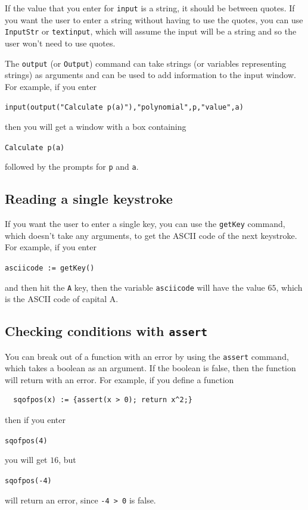 \documentclass[a4paper,11pt]{book}
\begin{document}
If the value that you enter for \texttt{input} is a string, it should
be between quotes.  If you want the user to enter a string without
having to use the quotes, you can use
\texttt{InputStr} or
\texttt{textinput}, which will assume the input will
be a string and so the user won't need to use quotes.

The \texttt{output} (or \texttt{Output})
command can take strings (or variables representing strings) as
arguments and can be used to add information to the input window.  For
example, if you enter
\begin{center}
{\tt input(output("Calculate p(a)"),"polynomial",p,"value",a)}
\end{center}
then you will get a window with a box containing
\begin{center}
{\tt Calculate p(a)}
\end{center}
followed by the prompts for \texttt{p} and \texttt{a}.

\subsection{Reading a single keystroke}

If you want the user to enter a single key, you can use the
\texttt{getKey} command, which doesn't take any
arguments, to get the ASCII code of the next keystroke.  For example,
if you enter
\begin{center}
{\tt  asciicode := getKey()}
\end{center}
and then hit the \texttt{A} key, then the variable \texttt{asciicode}
will have the value $65$, which is the ASCII code of capital A.

\subsection{Checking conditions with \texttt{assert}}

You can break out of a function with an error by using the
\texttt{assert} command, which takes a boolean as an argument.  If the
boolean is false, then the function will return with an error.  For
example, if you define a function
\begin{verbatim}
  sqofpos(x) := {assert(x > 0); return x^2;}
\end{verbatim}
then if you enter
\begin{center}
{\tt  sqofpos(4)}
\end{center}
you will get $16$, but 
\begin{center}
{\tt  sqofpos(-4)}
\end{center}
will return an error, since \texttt{-4 > 0} is false.
\end{document}
